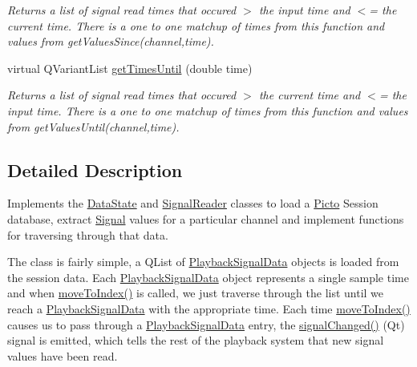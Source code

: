 \begin{DoxyCompactItemize}
\begin{DoxyCompactList}\small\item\em Returns a list of signal read times that occured $>$ the input time and $<$= the current time. There is a one to one matchup of times from this function and values from get\-Values\-Since(channel,time). \end{DoxyCompactList}\item 
\hypertarget{class_picto_1_1_signal_state_a45ec874f664a431330ba35d7d2dd63f0}{virtual Q\-Variant\-List \hyperlink{class_picto_1_1_signal_state_a45ec874f664a431330ba35d7d2dd63f0}{get\-Times\-Until} (double time)}\label{class_picto_1_1_signal_state_a45ec874f664a431330ba35d7d2dd63f0}

\begin{DoxyCompactList}\small\item\em Returns a list of signal read times that occured $>$ the current time and $<$= the input time. There is a one to one matchup of times from this function and values from get\-Values\-Until(channel,time). \end{DoxyCompactList}\end{DoxyCompactItemize}


\subsection{Detailed Description}
Implements the \hyperlink{class_picto_1_1_data_state}{Data\-State} and \hyperlink{class_picto_1_1_signal_reader}{Signal\-Reader} classes to load a \hyperlink{namespace_picto}{Picto} Session database, extract \hyperlink{class_picto_1_1_signal}{Signal} values for a particular channel and implement functions for traversing through that data. 

The class is fairly simple, a Q\-List of \hyperlink{struct_picto_1_1_playback_signal_data}{Playback\-Signal\-Data} objects is loaded from the session data. Each \hyperlink{struct_picto_1_1_playback_signal_data}{Playback\-Signal\-Data} object represents a single sample time and when \hyperlink{class_picto_1_1_signal_state_a0b2ecb912382f2e5605d24ffaca7a093}{move\-To\-Index()} is called, we just traverse through the list until we reach a \hyperlink{struct_picto_1_1_playback_signal_data}{Playback\-Signal\-Data} with the appropriate time. Each time \hyperlink{class_picto_1_1_signal_state_a0b2ecb912382f2e5605d24ffaca7a093}{move\-To\-Index()} causes us to pass through a \hyperlink{struct_picto_1_1_playback_signal_data}{Playback\-Signal\-Data} entry, the \hyperlink{class_picto_1_1_signal_state_ac184ce52fd8ace38fcf780efa6bb35d5}{signal\-Changed()} (Qt) signal is emitted, which tells the rest of the playback system that new signal values have been read.

